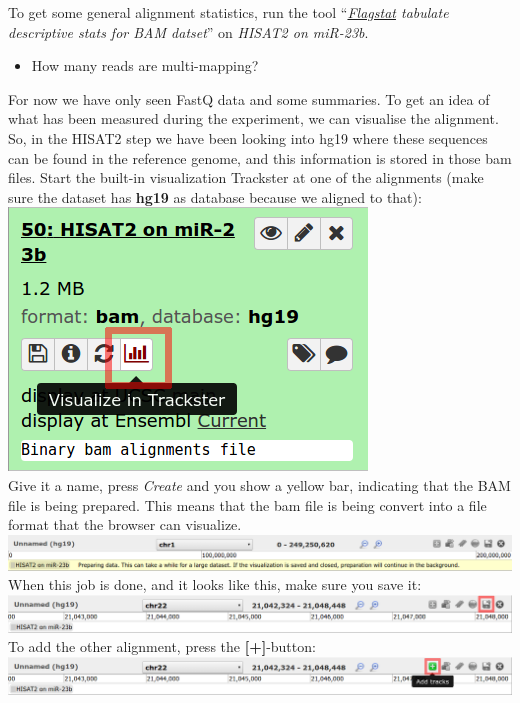 \documentclass[11pt,a4paper]{article}
\begin{document}
To get some general alignment statistics, run the tool ``\textit{\underline{Flagstat} tabulate descriptive stats for BAM datset}'' on \textit{HISAT2 on miR-23b}.
\begin{itemize}
	\item How many reads are multi-mapping?
\end{itemize}
For now we have only seen FastQ data and some summaries. To get an idea of what has been measured during the experiment, we can visualise the alignment. So, in the HISAT2 step we have been looking into hg19 where these sequences can be found in the reference genome, and this information is stored in those bam files. Start the built-in visualization Trackster at one of the alignments (make sure the dataset has \textbf{hg19} as database because we aligned to that):\\
\includegraphics[scale=0.55]{figures/alignment_03}\\
Give it a name, press \textit{Create} and you show a yellow bar, indicating that the BAM file is being prepared. This means that the bam file is being convert into a file format that the browser can visualize. \includegraphics[width=\textwidth]{figures/alignment_04.png}\\
When this job is done, and it looks like this, make sure you save it:\\
\includegraphics[width=\textwidth]{figures/alignment_05.png}\\
To add the other alignment, press the \textbf{[+]}-button:\\
\includegraphics[width=\textwidth]{figures/alignment_06.png}\\
\end{document}

